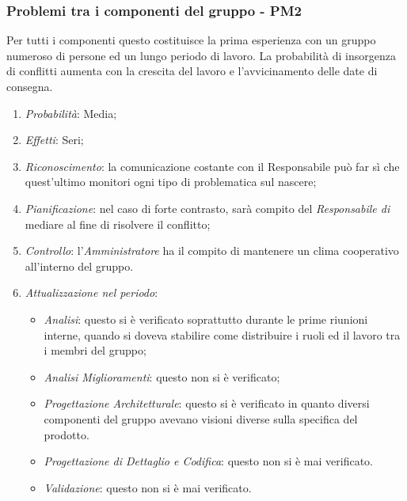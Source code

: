 \subsubsection{Problemi tra i componenti del gruppo - PM2}
Per tutti i componenti questo  costituisce la prima esperienza con un gruppo numeroso di persone ed un lungo periodo di lavoro. La probabilit\`a di insorgenza di conflitti aumenta con la crescita del lavoro e l'avvicinamento delle date di consegna.
\begin{enumerate}
\item \textit{Probabilit\`a}: Media;
\item \textit{Effetti}: Seri;
\item \textit{Riconoscimento}: la comunicazione costante con il Responsabile può far sì che quest’ultimo monitori ogni tipo di problematica sul nascere;
\item \textit{Pianificazione}: nel caso di forte contrasto, sar\`a compito del \textit{Responsabile di } mediare al fine di risolvere il conflitto;
\item \textit{Controllo}: l'\textit{Amministratore} ha il compito di mantenere un clima cooperativo all'interno del gruppo.
\item \textit{Attualizzazione nel periodo}: 
	\begin{itemize}
	\item \textit{Analisi}: questo  si è verificato soprattutto durante le prime riunioni interne, quando si doveva stabilire come distribuire i ruoli ed il lavoro tra i membri del gruppo;
	\item \textit{Analisi Miglioramenti}: questo  non si è verificato;
	\item \textit{Progettazione Architetturale}: questo  si è verificato in quanto diversi componenti del gruppo avevano visioni diverse sulla specifica del prodotto.
	\item \textit{Progettazione di Dettaglio e Codifica}: questo  non si è mai verificato.
	\item \textit{Validazione}: questo  non si è mai verificato.
	\end{itemize}
\end{enumerate} 

